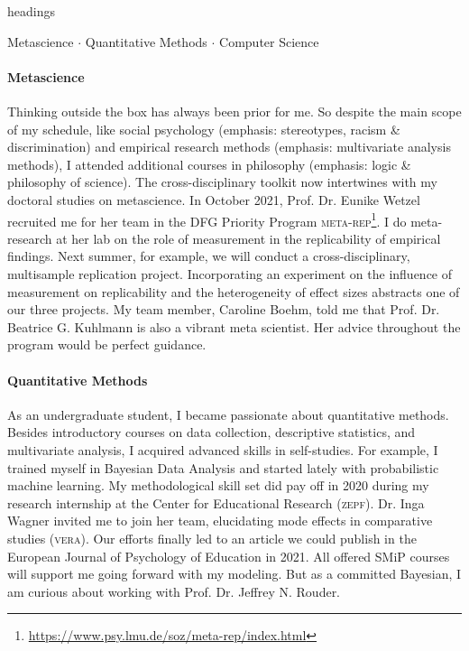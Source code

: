 \documentclass[11pt]{FreemanML}
\begin{document}
\begin{color}{headings}
	\begin{center}
		Metascience $\cdot$ Quantitative Methods $\cdot$ Computer Science
	\end{center}
\end{color}
\vspace{-0.2cm}

\paragraph{Metascience}
Thinking outside the box has always been prior for me. So despite the main
scope of my schedule, like social psychology (emphasis: stereotypes, racism \&
discrimination) and empirical research methods (emphasis: multivariate analysis
methods), I attended additional courses in philosophy (emphasis: logic \&
philosophy of science). The cross-disciplinary toolkit now intertwines with my
doctoral studies on metascience. In October 2021, Prof. Dr. Eunike Wetzel
recruited me for her team in the DFG Priority Program
\textsc{meta-rep}\footnote{\url{https://www.psy.lmu.de/soz/meta-rep/index.html}}.
I do meta-research at her lab on the role of measurement in the replicability
of empirical findings. Next summer, for example, we will conduct a
cross-disciplinary, multisample replication project. Incorporating an
experiment on the influence of measurement on replicability and the
heterogeneity of effect sizes abstracts one of our three projects. My team
member, Caroline Boehm, told me that Prof. Dr. Beatrice G. Kuhlmann is also a
vibrant meta scientist. Her advice throughout the program would be perfect
guidance.

\paragraph{Quantitative Methods}

As an undergraduate student, I became passionate about quantitative methods.
Besides introductory courses on data collection, descriptive statistics, and
multivariate analysis, I acquired advanced skills in self-studies. For example,
I trained myself in Bayesian Data Analysis and started lately with
probabilistic machine learning. My methodological skill set did pay off in 2020
during my research internship at the Center for Educational Research
(\textsc{zepf}). Dr. Inga Wagner invited me to join her team, elucidating mode
effects in comparative studies (\textsc{vera}). Our efforts finally led to an
article we could publish in the European Journal of Psychology of Education in
2021. All offered SMiP courses will support me going forward with my modeling.
But as a committed Bayesian, I am curious about working with Prof. Dr. Jeffrey
N. Rouder.
\end{document}
